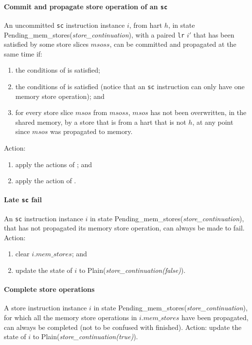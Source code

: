 \paragraph{Commit and propagate store operation of an {\tt sc}}\label{omm:commit_sc}
An uncommitted {\tt sc} instruction instance $i$, from hart $h$, in state {\sc Pending\_mem\_stores}({\it store\_continuation}), with a paired {\tt lr} $i'$ that has been satisfied by some store slices $msoss$, can be committed and propagated at the same time if:
\begin{enumerate}
\item the conditions of  is satisfied;
\item the conditions of  is satisfied (notice that an {\tt sc} instruction can only have one memory store operation); and
\item for every store slice $msos$ from $msoss$, $msos$ has not been overwritten, in the shared memory, by a store that is from a hart that is not $h$, at any point since $msos$ was propagated to memory.
\end{enumerate}
Action:
\begin{enumerate}
\item apply the actions of ; and
\item apply the action of .
\end{enumerate}


\paragraph{Late {\tt sc} fail}\label{omm:late_sc_fail}
An {\tt sc} instruction instance $i$ in state {\sc Pending\_mem\_stores}({\it store\_continuation}), that has not propagated its memory store operation, can always be made to fail.
Action:
\begin{enumerate}
\item clear $i.\textit{mem\_stores}$; and
\item update the state of $i$ to {\sc Plain}({\it store\_continuation(false)}).
\end{enumerate}


\paragraph{Complete store operations}\label{omm:complete_stores}
A store instruction instance $i$ in state {\sc Pending\_mem\_stores}({\it store\_continuation}), for which all the memory store operations in $i.\textit{mem\_stores}$ have been propagated, can always be completed (not to be confused with finished).
Action: update the state of $i$ to {\sc Plain}({\it store\_continuation(true)}).


